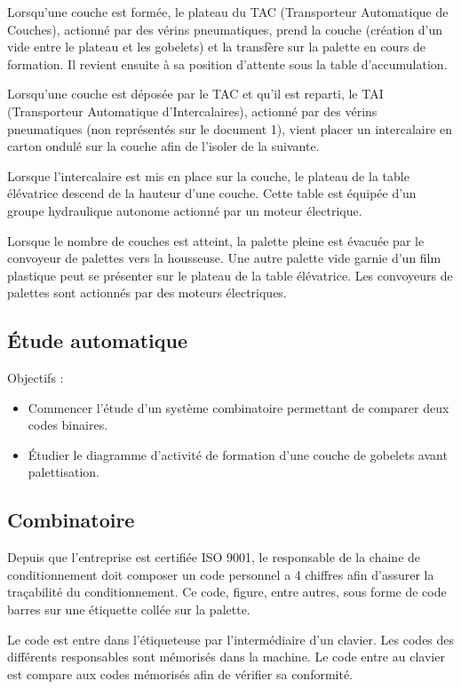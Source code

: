 Lorsqu'une couche est formée, le plateau du TAC (Transporteur Automatique de Couches), actionné par des vérins pneumatiques, prend la couche (création d'un vide entre le plateau et les gobelets) et la transfère sur la palette en cours de formation. Il revient ensuite à sa position d'attente sous la table d'accumulation.

Lorsqu'une couche est déposée par le TAC et qu'il est reparti, le TAI (Transporteur Automatique d'Intercalaires), actionné par des vérins pneumatiques (non représentés sur le document 1), vient placer un intercalaire en carton ondulé sur la couche afin de l'isoler de la suivante.

Lorsque l'intercalaire est mis en place sur la couche, le plateau de la table élévatrice descend de la hauteur d'une couche. Cette table est équipée d'un groupe hydraulique autonome actionné par un moteur électrique.

Lorsque le nombre de couches est atteint, la palette pleine est évacuée par le convoyeur de palettes vers la housseuse. Une autre palette vide garnie d'un film plastique peut se présenter sur le plateau de la table élévatrice. Les convoyeurs de palettes sont actionnés par des moteurs électriques.


\subsection{Étude automatique}

Objectifs :
\begin{itemize}
 \item Commencer l'étude d'un système combinatoire permettant de comparer deux codes binaires.
 \item Étudier le diagramme d'activité de formation d'une couche de gobelets avant palettisation.
\end{itemize}

\subsection{Combinatoire}

Depuis que l'entreprise est certifiée ISO 9001, le responsable de la chaine de conditionnement doit composer un code personnel a 4 chiffres afin d'assurer la traçabilité du conditionnement. Ce code, figure, entre autres, sous forme de code barres sur une étiquette collée sur la palette.

Le code est entre dans l'étiqueteuse par l'intermédiaire d'un clavier. Les codes des différents responsables sont mémorisés dans la machine. Le code entre au clavier est compare aux codes mémorisés afin de vérifier sa conformité.

